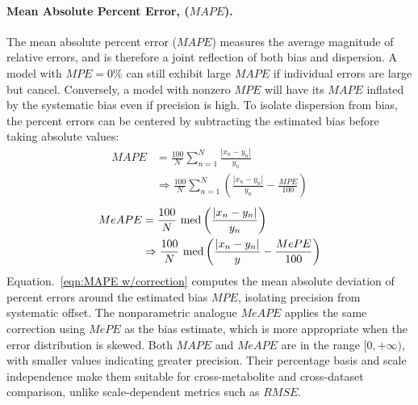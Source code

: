 \paragraph{Mean Absolute Percent Error, ($MAPE$).}
The mean absolute percent error ($MAPE$) measures the average magnitude of relative errors, and is therefore a joint reflection of both bias and dispersion. A model with $MPE = 0\%$ can still exhibit large $MAPE$ if individual errors are large but cancel. Conversely, a model with nonzero $MPE$ will have its $MAPE$ inflated by the systematic bias even if precision is high. To isolate dispersion from bias, the percent errors can be centered by subtracting the estimated bias before taking absolute values:
\begin{subequations}\label{eqn:MAPE}
\begin{align}
    MAPE &= \frac{100}{N} \sum_{n=1}^N \frac{|x_n-y_n|}{y_n} \label{eqn:MAPE basic}\\ &\Rightarrow \frac{100}{N} \sum_{n=1}^N \left( \frac{|x_n-y_n|}{y_n} - \frac{MPE}{100} \right) \label{eqn:MAPE w/correction}
\end{align}
\end{subequations}
\begin{equation}\label{eqn:MeAPE}
\begin{aligned}
    MeAPE &= \frac{100}{N}\ \textnormal{med}\left( \frac{|x_n-y_n|}{y_n} \right) \\ &\Rightarrow \frac{100}{N}\ \textnormal{med} \left( \frac{|x_n-y_n|}{y} - \frac{MePE}{100} \right)
\end{aligned}
\end{equation}
\noindent Equation.~\ref{eqn:MAPE w/correction} computes the mean absolute deviation of percent errors around the estimated bias $MPE$, isolating precision from systematic offset. The nonparametric analogue $MeAPE$ applies the same correction using $MePE$ as the bias estimate, which is more appropriate when the error distribution is skewed. Both $MAPE$ and $MeAPE$ are in the range $[0, +\infty)$, with smaller values indicating greater precision. Their percentage basis and scale independence make them suitable for cross-metabolite and cross-dataset comparison, unlike scale-dependent metrics such as $RMSE$.


